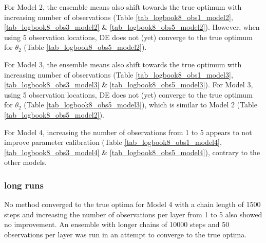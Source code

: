 For Model 2, the ensemble means also shift towards the true optimum with increasing number of observations (Table \ref{tab_logbook8_obs1_model2}, \ref{tab_logbook8_obs3_model2} \& \ref{tab_logbook8_obs5_model2}). However, when using 5 observation locations, DE does not (yet) converge to the true optimum for $\theta_2$ (Table \ref{tab_logbook8_obs5_model2}). 

For Model 3, the ensemble means also shift towards the true optimum with increasing number of observations (Table \ref{tab_logbook8_obs1_model3}, \ref{tab_logbook8_obs3_model3} \& \ref{tab_logbook8_obs5_model3}). For Model 3, using 5 observation locations, DE does not (yet) converge to the true optimum for $\theta_2$ (Table \ref{tab_logbook8_obs5_model3}), which is similar to Model 2 (Table \ref{tab_logbook8_obs5_model2}).

For Model 4, increasing the number of observations from 1 to 5 appears to not improve parameter calibration (Table \ref{tab_logbook8_obs1_model4}, \ref{tab_logbook8_obs3_model4} \& \ref{tab_logbook8_obs5_model4}), contrary to the other models.

\subsubsection{long runs}
No method converged to the true optima for Model 4 with a chain length of 1500 steps and increasing the number of observations per layer from 1 to 5 also showed no improvement. An ensemble with longer chains of 10000 steps and 50 observations per layer was run in an attempt to converge to the true optima. 


\clearpage

